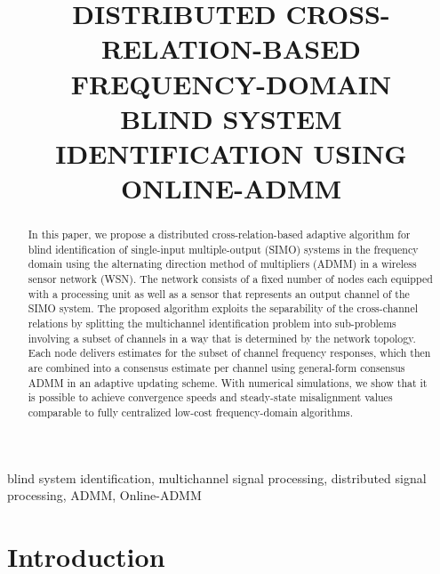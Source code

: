 \documentclass{article}
\title{DISTRIBUTED CROSS-RELATION-BASED FREQUENCY-DOMAIN\\ BLIND SYSTEM IDENTIFICATION USING ONLINE-ADMM}
\begin{document}
%
\maketitle
%
\begin{abstract}
    In this paper, we propose a distributed cross-relation-based adaptive algorithm for blind identification of single-input multiple-output (SIMO) systems in the frequency domain using the alternating direction method of multipliers (ADMM) in a wireless sensor network (WSN).
    The network consists of a fixed number of nodes each equipped with a processing unit as well as a sensor that represents an output channel of the SIMO system.
    The proposed algorithm exploits the separability of the cross-channel relations by splitting the multichannel identification problem into sub-problems involving a subset of channels in a way that is determined by the network topology.
    Each node delivers estimates for the subset of channel frequency responses, which then are combined into a consensus estimate per channel using general-form consensus ADMM in an adaptive updating scheme.
    With numerical simulations, we show that it is possible to achieve convergence speeds and steady-state misalignment values comparable to fully centralized low-cost frequency-domain algorithms.
\end{abstract}
%
\begin{keywords}
    blind system identification, multichannel signal processing, distributed signal processing, ADMM, Online-ADMM
\end{keywords}
%
\section{Introduction}
\label{sec:intro}
\end{document}
